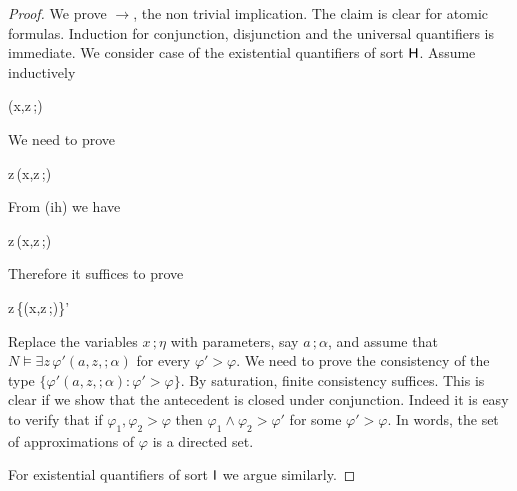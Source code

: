 \documentclass[10pt,oneside]{amsproc}
\begin{document}
\begin{proof}
  We prove $\rightarrow$, the non trivial implication.
  The claim is clear for atomic formulas.
  Induction for conjunction, disjunction and the universal quantifiers is immediate.
%
%
%
%
%
  We consider case of the existential quantifiers of sort ${\sf H}$.
  Assume inductively
  
  {\rightarrow}
  {\varphi(x,z\,;\eta)}

  We need to prove

  {\rightarrow}
  {\exists z\,\varphi(x,z\,;\eta)}

  From (ih) we have

  {\rightarrow}
  {\exists z\,\varphi(x,z\,;\eta)}

  Therefore it suffices to prove

  {\rightarrow}
  {\exists z\,\{\varphi(x,z\,;\eta)\}'}

Replace the variables $x\,;\eta$ with parameters, say $a\,;\alpha$, and assume that $N\models\exists z\,\varphi'(a,z,;\alpha)$ for every $\varphi'>\varphi$.
We need to prove the consistency of the type $\{\varphi'(a,z,;\alpha):\varphi'>\varphi\}$.
By saturation, finite consistency suffices.
This is clear if we show that the antecedent is closed under conjunction.
Indeed it is easy to verify that if $\varphi_1,\varphi_2>\varphi$ then $\varphi_1\wedge\varphi_2>\varphi'$ for some $\varphi'>\varphi$.
In words, the set of approximations of $\varphi$ is a directed set.

For existential quantifiers of sort ${\sf I}$ we argue similarly.%
%
%
%
%
%
\end{proof}
\end{document}
